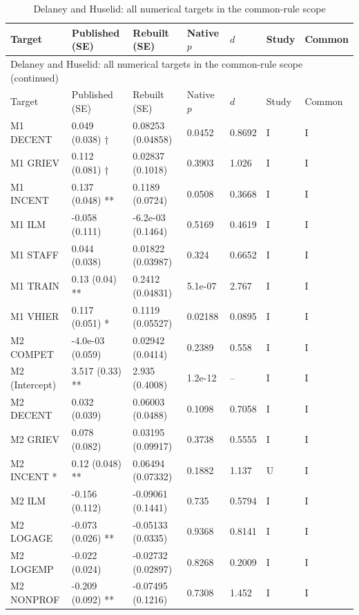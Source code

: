 {\scriptsize\setlength{\tabcolsep}{3pt}\renewcommand{\arraystretch}{1.06}
\begin{longtable}{@{}p{.245\linewidth}p{.17\linewidth}p{.17\linewidth}p{.085\linewidth}p{.060\linewidth}p{.08\linewidth}p{.07\linewidth}@{}}
\caption{Delaney and Huselid: all numerical targets in the common-rule scope}\label{tab:all:delaney1996}\\
\toprule Target & Published (SE) & Rebuilt (SE) & Native $p$ & $d$ & Study & Common\\\midrule
\endfirsthead\multicolumn{7}{l}{\small Delaney and Huselid: all numerical targets in the common-rule scope (continued)}\\\toprule Target & Published (SE) & Rebuilt (SE) & Native $p$ & $d$ & Study & Common\\\midrule\endhead\bottomrule\endfoot
M1 DECENT & 0.049 (0.038) † & 0.08253 (0.04858) & 0.0452 & 0.8692 & I & I\\
M1 GRIEV & 0.112 (0.081) † & 0.02837 (0.1018) & 0.3903 & 1.026 & I & I\\
M1 INCENT & 0.137 (0.048) ** & 0.1189 (0.0724) & 0.0508 & 0.3668 & I & I\\
M1 ILM & -0.058 (0.111) & -6.2e-03 (0.1464) & 0.5169 & 0.4619 & I & I\\
M1 STAFF & 0.044 (0.038) & 0.01822 (0.03987) & 0.324 & 0.6652 & I & I\\
M1 TRAIN & 0.13 (0.04) ** & 0.2412 (0.04831) & 5.1e-07 & 2.767 & I & I\\
M1 VHIER & 0.117 (0.051) * & 0.1119 (0.05527) & 0.02188 & 0.0895 & I & I\\
M2 COMPET & -4.0e-03 (0.059) & 0.02942 (0.0414) & 0.2389 & 0.558 & I & I\\
M2 (Intercept) & 3.517 (0.33) ** & 2.935 (0.4008) & 1.2e-12 & -- & I & I\\
M2 DECENT & 0.032 (0.039) & 0.06003 (0.0488) & 0.1098 & 0.7058 & I & I\\
M2 GRIEV & 0.078 (0.082) & 0.03195 (0.09917) & 0.3738 & 0.5555 & I & I\\
M2 INCENT * & 0.12 (0.048) ** & 0.06494 (0.07332) & 0.1882 & 1.137 & U & I\\
M2 ILM & -0.156 (0.112) & -0.09061 (0.1441) & 0.735 & 0.5794 & I & I\\
M2 LOGAGE & -0.073 (0.026) ** & -0.05133 (0.0335) & 0.9368 & 0.8141 & I & I\\
M2 LOGEMP & -0.022 (0.024) & -0.02732 (0.02897) & 0.8268 & 0.2009 & I & I\\
M2 NONPROF & -0.209 (0.092) ** & -0.07495 (0.1216) & 0.7308 & 1.452 & I & I\\

\end{longtable}}
